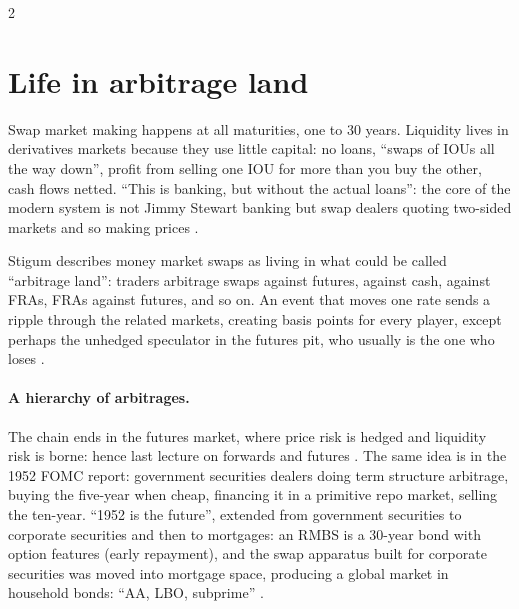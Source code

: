 \begin{paracol}{2}
\section{Life in arbitrage land}\label{sec:irs-arbland}

Swap market making happens at all maturities, one to 30 years. Liquidity lives in derivatives markets because they use little capital: no loans, ``swaps of IOUs
all the way down'', profit from selling one IOU for more than you buy the other, cash flows netted. ``This is banking, but without the actual loans'': the core of
the modern system is not Jimmy Stewart banking but swap dealers quoting two-sided markets and so making prices .

\begin{reading}
Stigum describes money market swaps as living in what could be called ``arbitrage land'': traders arbitrage swaps against futures, against cash, against FRAs, FRAs
against futures, and so on. An event that moves one rate sends a ripple through the related markets, creating basis points for every player, except perhaps the
unhedged speculator in the futures pit, who usually is the one who loses .
\end{reading}

\paragraph{A hierarchy of arbitrages.} The chain ends in the futures market, where price risk is hedged and liquidity risk is borne: hence last lecture on forwards
and futures . The same idea is in the 1952 FOMC report: government securities dealers doing term structure arbitrage, buying the
five-year when cheap, financing it in a primitive repo market, selling the ten-year. ``1952 is the future'', extended from government securities to corporate
securities and then to mortgages: an RMBS is a 30-year bond with option features (early repayment), and the swap apparatus built for corporate securities was moved
into mortgage space, producing a global market in household bonds: ``AA, LBO, subprime'' .


\end{paracol}
